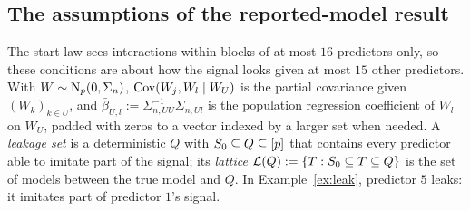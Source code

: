\subsection{The assumptions of the reported-model result}\label{sec:a-rm}

The start law sees interactions within blocks of at most $16$ predictors only, so these conditions are about how the
signal looks given at most $15$ other predictors. With $W\sim\mathrm{N}_p(0,\Sigma_n)$, $\operatorname{Cov}(W_j,W_l\mid W_U)$ is the partial
covariance given $(W_k)_{k\in U}$, and $\bar\beta_{U,l}:=\Sigma_{n,UU}^{-1}\Sigma_{n,Ul}$ is the population regression
coefficient of $W_l$ on $W_U$, padded with zeros to a vector indexed by a larger set when needed. A \emph{leakage set} is
a deterministic $Q$ with $S_0\subseteq Q\subseteq[p]$ that contains every predictor able to imitate part of the
signal; its \emph{lattice} $\mathcal L(Q):=\{T:S_0\subseteq T\subseteq Q\}$ is the set of models between the true model and $Q$.
In Example~\ref{ex:leak}, predictor $5$ leaks: it imitates part of predictor $1$'s signal.

